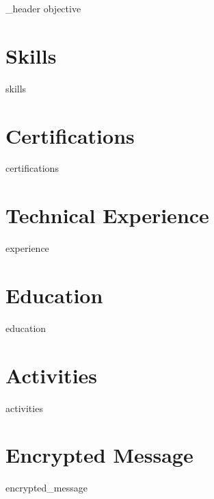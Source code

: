 \documentclass[letter,10pt]{article}
\author{Takasur Azeem} %
\begin{document}
{_header}
{objective}

\section{Skills}
{skills}

\section{Certifications}
{certifications}

\section{Technical Experience}
{experience}

\section{Education}
{education}


\section{Activities}
{activities}

\section{Encrypted Message}
{encrypted_message}
\end{document}
